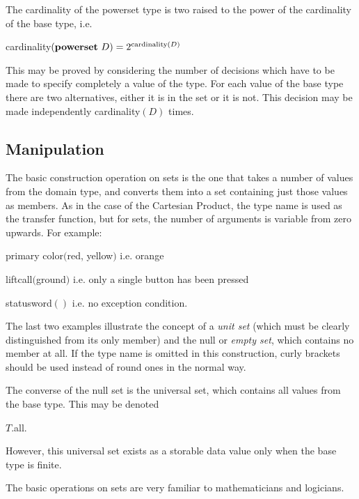 The cardinality of the powerset type is two raised to the power of the cardinality of the base type, i.e.

\quad cardinality$(\text{\textbf{powerset} } D) = 2^{\text{cardinality} (D)}$

This may be proved by considering the number of decisions which have to be made to specify completely a value of the type. For each value of the base type there are two alternatives, either it is in the set or it is not. This decision may be made independently cardinality$(D)$ times.

\subsection{Manipulation}

The basic construction operation on sets is the one that takes a number of values from the domain type, and converts them into a set containing just those values as members. As in the case of the Cartesian Product, the type name is used as the transfer function, but for sets, the number of arguments is variable from zero upwards. For example:

\quad primary color$($red, yellow$)$ \tabto*{14em} i.e. orange

\quad liftcall$($ground$)$ \tabto*{14em}  i.e. only a single button has been pressed

\quad statusword$()$ \tabto*{14em} i.e. no exception condition.

\noindent
The last two examples illustrate the concept of a \textit{unit set} (which must be clearly distinguished from its only member) and the null or \textit{empty set}, which contains no member at all. If the type name is omitted in this construction, curly brackets should be used instead of round ones in the normal way.

The converse of the null set is the universal set, which contains all values from the base type. This may be denoted

\quad $T$.all.

\noindent
However, this universal set exists as a storable data value only when the base type is finite.

The basic operations on sets are very familiar to mathematicians and logicians.

